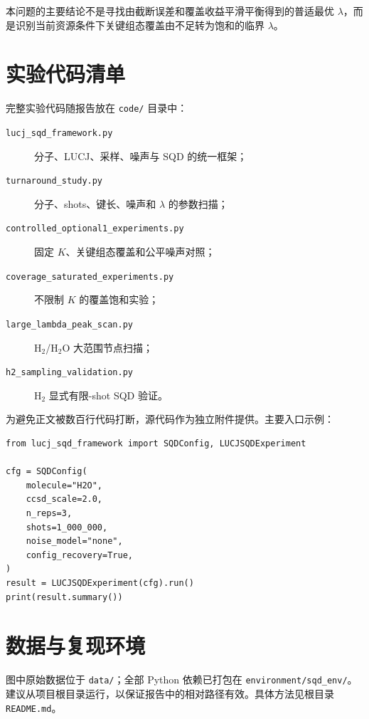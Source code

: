 \documentclass[UTF8,12pt,a4paper]{ctexart}
\begin{document}
本问题的主要结论不是寻找由截断误差和覆盖收益平滑平衡得到的普适最优 $\lambda$，而是识别当前资源条件下关键组态覆盖由不足转为饱和的临界 $\lambda$。

\appendix
\section{实验代码清单}

完整实验代码随报告放在 \texttt{code/} 目录中：
\begin{description}
  \item[\texttt{lucj\_sqd\_framework.py}] 分子、LUCJ、采样、噪声与 SQD 的统一框架；
  \item[\texttt{turnaround\_study.py}] 分子、shots、键长、噪声和 $\lambda$ 的参数扫描；
  \item[\texttt{controlled\_optional1\_experiments.py}] 固定 $K$、关键组态覆盖和公平噪声对照；
  \item[\texttt{coverage\_saturated\_experiments.py}] 不限制 $K$ 的覆盖饱和实验；
  \item[\texttt{large\_lambda\_peak\_scan.py}] H$_2$/H$_2$O 大范围节点扫描；
  \item[\texttt{h2\_sampling\_validation.py}] H$_2$ 显式有限-shot SQD 验证。
\end{description}

为避免正文被数百行代码打断，源代码作为独立附件提供。主要入口示例：
\begin{lstlisting}
from lucj_sqd_framework import SQDConfig, LUCJSQDExperiment

cfg = SQDConfig(
    molecule="H2O",
    ccsd_scale=2.0,
    n_reps=3,
    shots=1_000_000,
    noise_model="none",
    config_recovery=True,
)
result = LUCJSQDExperiment(cfg).run()
print(result.summary())
\end{lstlisting}

\section{数据与复现环境}

图中原始数据位于 \texttt{data/}；全部 Python 依赖已打包在 \texttt{environment/sqd\_env/}。建议从项目根目录运行，以保证报告中的相对路径有效。具体方法见根目录 \texttt{README.md}。
\end{document}
